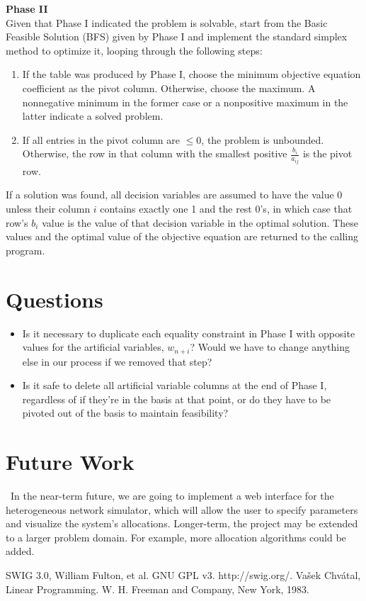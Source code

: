 \documentclass[11pt]{article}
\begin{document}
\noindent \textbf{Phase II}\\
Given that Phase I indicated the problem is solvable, start from the Basic Feasible Solution (BFS) given by Phase I and implement the standard simplex method to optimize it, looping through the following steps:
\begin{enumerate}
\item If the table was produced by Phase I, choose the minimum objective equation coefficient as the pivot column. Otherwise, choose the maximum. A nonnegative minimum in the former case or a nonpositive maximum in the latter indicate a solved problem.
\item If all entries in the pivot column are $\leq 0$, the problem is unbounded. Otherwise, the row in that column with the smallest positive $\frac{b_i}{a_{ij}}$ is the pivot row.
\end{enumerate}
If a solution was found, all decision variables are assumed to have the value 0 unless their column $i$ contains exactly one 1 and the rest 0's, in which case that row's $b_i$ value is the value of that decision variable in the optimal solution. These values and the optimal value of the objective equation are returned to the calling program.

\section{Questions}

\begin{itemize}
\item Is it necessary to duplicate each equality constraint in Phase I with opposite values for the artificial variables, $w_{n+i}$? Would we have to change anything else in our process if we removed that step?
\item Is it safe to delete all artificial variable columns at the end of Phase I, regardless of if they're in the basis at that point, or do they have to be pivoted out of the basis to maintain feasibility?
\end{itemize}

\section{Future Work}

~\indent In the near-term future, we are going to implement a web interface for the heterogeneous network simulator, which will allow the user to specify parameters and visualize the system's allocations. Longer-term, the project may be extended to a larger problem domain. For example, more allocation algorithms could be added.

\begin{thebibliography}{9}
  SWIG 3.0,
  William Fulton, et al.  
  GNU GPL v3.
  http://swig.org/.
  Vašek Chvátal,
  Linear Programming.
  W. H. Freeman and Company, New York,
  1983.
\end{thebibliography}  
       
\end{document}
